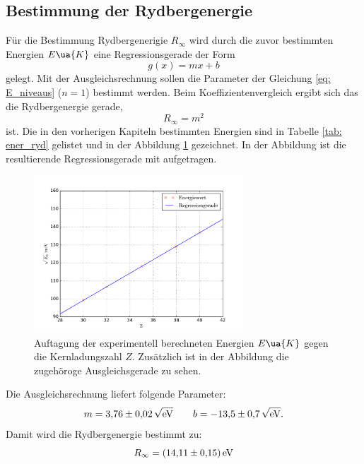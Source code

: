 \subsection{Bestimmung der Rydbergenergie}
Für die Bestimmung Rydbergenerigie $R_\infty$ wird durch die zuvor %
bestimmten Energien $E\ua{K}$ eine Regressionsgerade der Form
\begin{equation*}
  g(x)=mx+b
\end{equation*}
gelegt. Mit der Ausgleichsrechnung sollen die Parameter der Gleichung \eqref{eq: E_niveaus} ($n=1$)
bestimmt werden. Beim Koeffizientenvergleich ergibt sich das die Rydbergenergie
gerade, %
\begin{equation*}
  R_\infty=m^2
\end{equation*}
ist. %
Die in den vorherigen Kapiteln bestimmten Energien sind in Tabelle \ref{tab: ener_ryd} gelistet %
und in der Abbildung \ref{fig: ryd_ener} gezeichnet. In der Abbildung ist %
die resultierende Regressionsgerade mit aufgetragen.

\begin{figure}
  \centering
  \includegraphics[width=0.7\textwidth]{../Messdaten/energie_z.pdf}
  \caption{Auftagung der experimentell berechneten Energien $E\ua{K}$ gegen die Kernladungszahl $Z$. Zusätzlich ist in der Abbildung die zugehöroge Ausgleichsgerade zu sehen.} %
  \label{fig: ryd_ener}
\end{figure}
Die Ausgleichsrechnung liefert folgende Parameter:
\begin{equation*}
m=\num{3.76\pm0.02}\,\sqrt{\si{\eV}} \qquad b=\num{-13.5\pm0.7}\,\sqrt{\si{\eV}}.
\end{equation*}
Damit wird die Rydbergenergie bestimmt zu:
\begin{equation}
  R_\infty=\SI{14.11\pm0.15}{\eV}
\end{equation}
\FloatBarrier

